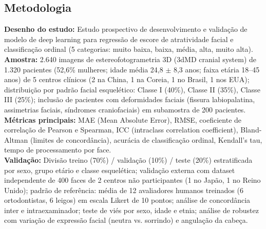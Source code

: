 \subsection{Metodologia}
\textbf{Desenho do estudo:} Estudo prospectivo de desenvolvimento e
validação de modelo de deep learning para regressão de escore de
atratividade facial e classificação ordinal (5 categorias: muito
baixa, baixa, média, alta, muito alta). \\
\textbf{Amostra:} 2.640 imagens de estereofotogrametria 3D (3dMD
cranial system) de 1.320 pacientes (52,6\% mulheres; idade média
24,8 $\pm$ 8,3 anos; faixa etária 18--45 anos) de 5 centros
clínicos (2 na China, 1 na Coreia, 1 no Brasil, 1 nos EUA);
distribuição por padrão facial esquelético: Classe I (40\%),
Classe II (35\%), Classe III (25\%); inclusão de pacientes com
deformidades faciais (fissura labiopalatina, assimetrias faciais,
síndromes craniofaciais) em subamostra de 200 pacientes. \\
\textbf{Métricas principais:} MAE (Mean Absolute Error), RMSE,
coeficiente de correlação de Pearson e Spearman, ICC (intraclass
correlation coefficient), Bland-Altman (limites de concordância),
acurácia de classificação ordinal, Kendall's tau, tempo de
processamento por face. \\
\textbf{Validação:} Divisão treino (70\%) / validação (10\%) / teste
(20\%) estratificada por sexo, grupo etário e classe esquelética;
validação externa com dataset independente de 400 faces de 2 centros
não participantes (1 no Japão, 1 no Reino Unido); padrão de
referência: média de 12 avaliadores humanos treinados (6 ortodontistas,
6 leigos) em escala Likert de 10 pontos; análise de concordância
inter e intraexaminador; teste de viés por sexo, idade e etnia;
análise de robustez com variação de expressão facial (neutra vs.
sorrindo) e angulação da cabeça.

